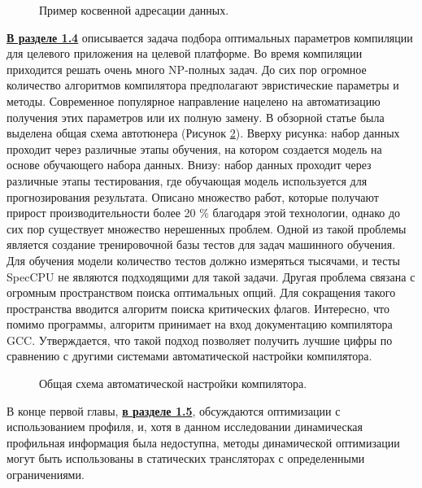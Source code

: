 \begin{figure}[htbp]
	\centering
	
	\caption{Пример косвенной адресации данных.}
	\label{syn:prefetch3}
\end{figure}

\underline{\textbf{В разделе 1.4}} описывается задача подбора оптимальных параметров компиляции
для целевого приложения на целевой платформе. Во время компиляции приходится
решать очень много NP-полных задач. До сих пор огромное количество алгоритмов
компилятора предполагают эвристические параметры и методы.
Современное популярное направление нацелено  на автоматизацию получения этих параметров или их полную замену. В обзорной статье была  выделена общая схема автотюнера (Рисунок \ref{syn:ml_for_comp1}). Вверху
рисунка: набор данных проходит через различные этапы обучения, на котором
создается модель на основе обучающего набора данных. Внизу: набор данных
проходит через различные этапы тестирования, где обучающая модель используется
для прогнозирования результата. Описано множество работ, которые получают прирост производительности более 20 \% благодаря этой технологии, однако до сих пор существует множество нерешенных проблем. Одной из такой проблемы является создание тренировочной базы тестов для задач машинного обучения. 
Для обучения модели количество тестов должно измеряться тысячами, и тесты SpecCPU не являются подходящими для такой задачи. Другая проблема связана с огромным пространством поиска оптимальных опций.  Для сокращения такого пространства вводится алгоритм поиска критических
флагов. Интересно, что помимо программы, алгоритм принимает на вход
документацию компилятора GCC. Утверждается, что такой подход позволяет
получить лучшие цифры по сравнению с другими системами автоматической
настройки компилятора.



 \begin{figure}[htbp]
	\centering
	
	\caption{Общая схема автоматической настройки компилятора.}
	\label{syn:ml_for_comp1}
\end{figure}



В конце первой главы, \underline{\textbf{в разделе 1.5}}, обсуждаются оптимизации с использованием
профиля, и, хотя в данном исследовании динамическая профильная
информация была недоступна, методы динамической оптимизации могут быть
использованы в статических трансляторах с определенными ограничениями.  

